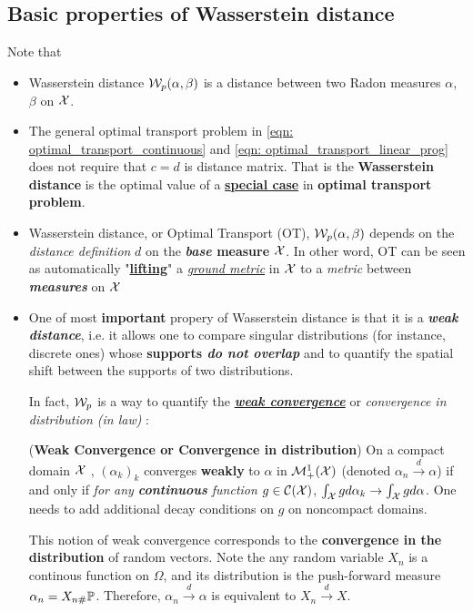 \documentclass[11pt]{article}
\begin{document}
\subsection{Basic properties of Wasserstein distance}
Note that 
\begin{itemize}
\item Wasserstein distance ${\mathcal W}_{p}(\alpha, \beta)$ is a distance between two Radon measures $\alpha$, $\beta$ on ${\mathcal X}$. 
\item The general optimal transport problem in \eqref{eqn: optimal_transport_continuous} and \eqref{eqn: optimal_transport_linear_prog} does not require that $c=d$ is distance matrix. That is the \textbf{Wasserstein distance} is the optimal value of a \underline{\textbf{special case}} in \textbf{optimal transport problem}. 
\item Wasserstein distance, or Optimal Transport (OT), ${\mathcal W}_{p}(\alpha, \beta)$ depends on the \emph{distance definition} $d$ on the \textbf{\emph{base} measure} ${\mathcal X}$. In other word, OT can be seen as automatically "\underline{\textbf{lifting}}" a \underline{\emph{ground metric}} in ${\mathcal X}$ to a \emph{metric} between \textbf{\emph{measures}} on ${\mathcal X}$

\item One of most \textbf{important} propery of Wasserstein distance is that  it is a \emph{\textbf{weak distance}}, i.e. it allows one to compare singular distributions (for instance, discrete ones) whose \textbf{supports \emph{do not overlap}} and to quantify the spatial shift between the supports of two distributions. 

In fact, ${\mathcal W}_{p}$ is a way to quantify the \underline{\emph{\textbf{weak convergence}}} or \emph{convergence in distribution (in law)} \citep{villani2009optimal}: 
\begin{definition} (\textbf{Weak Convergence or Convergence in distribution})
On a compact domain ${\mathcal X}$ , $(\alpha_k)_k$ converges \textbf{weakly} to $\alpha$ in ${\mathcal M}_{+}^{1}({\mathcal X})$ (denoted $\alpha_{n}\stackrel{d}{\rightarrow} \alpha$) if and only if \emph{for any \textbf{continuous} function} $g \in {\mathcal C}({\mathcal X})$, $\int_{{\mathcal X}} g d\alpha_k \rightarrow \int_{{\mathcal X}} g d\alpha$. One needs to add additional decay conditions on $g$ on noncompact domains. 

This notion of weak convergence corresponds to the \textbf{convergence in the distribution} of random vectors. Note the any random variable $X_{n}$ is a continous function on $\Omega$, and its distribution is the push-forward measure $\alpha_{n} = X_{n\#}{\mathbb P}$. Therefore, $\alpha_{n}\stackrel{d}{\rightarrow} \alpha$  is equivalent to $X_{n}\stackrel{d}{\rightarrow} X$.


\end{definition}
\end{itemize}
\end{document}
